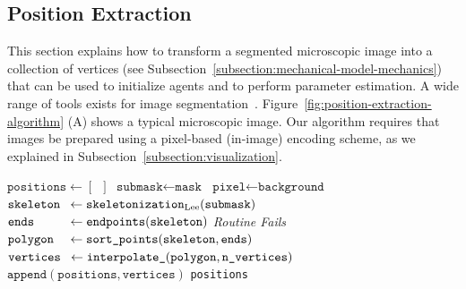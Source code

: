 \subsection{Position Extraction}
\label{subsec:position-extraction-algorithm}
This section explains how to transform a segmented microscopic image into a collection of vertices
(see Subsection~\ref{subsection:mechanical-model-mechanics}) that can be used
to initialize agents and to perform parameter estimation.
A wide range of tools exists for image segmentation~\cite{Stringer2020,Cutler2022,Hardo2022}.
Figure~\ref{fig:position-extraction-algorithm} (A) shows a typical microscopic image.
Our algorithm requires that images be prepared using a pixel-based (in-image) encoding scheme, as
we explained in Subsection~\ref{subsection:visualization}.

\begin{algorithm}
    \caption{The Position Extraction Algorithm}
    \label{algo:extraction-algorithm}
    \begin{algorithmic}[1]
        \State $\texttt{positions} \gets [\hspace{6pt}]$
            \State $\texttt{submask} \gets \texttt{mask}$%
                    \State $\texttt{pixel}\gets\texttt{background}$
                \EndIf
            \EndFor
            \State $\mathrlap{\texttt{skeleton}}\hphantom{\texttt{verticess}} \gets \texttt{skeletonization}_\text{Lee}(\texttt{submask})$
            \State $\mathrlap{\texttt{ends}}\hphantom{\texttt{verticess}} \gets \texttt{endpoints}(\texttt{skeleton})$
                \State \textit{Routine Fails}
            \EndIf
            \State $\mathrlap{\texttt{polygon}}\hphantom{\texttt{verticess}} \gets \texttt{sort\_points}(\texttt{skeleton},\texttt{ends})$
            \State $\mathrlap{\texttt{vertices}}\hphantom{\texttt{verticess}} \gets \texttt{interpolate\_}(\texttt{polygon}, \texttt{n\_vertices})$
            \State $\texttt{append}(\texttt{positions}, \texttt{vertices})$
        \EndFor
        \State \Return \texttt{positions}
        \EndFunction
    \end{algorithmic}
\end{algorithm}


